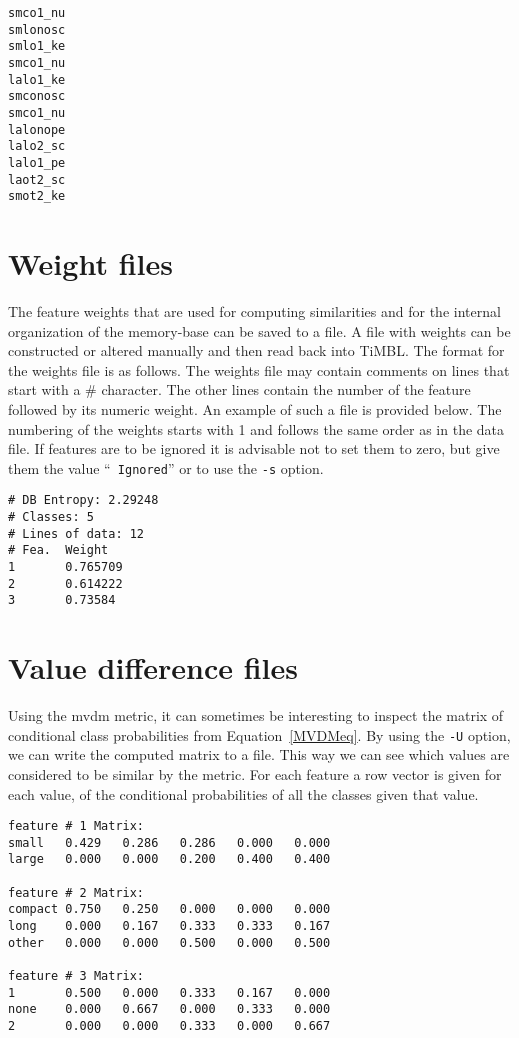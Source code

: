 \documentclass{report}
\begin{document}
\begin{verbatim}
smco1_nu
smlonosc
smlo1_ke
smco1_nu
lalo1_ke
smconosc
smco1_nu
lalonope
lalo2_sc
lalo1_pe
laot2_sc
smot2_ke
\end{verbatim}

\section{Weight files}
\label{weightformat}

The feature weights that are used for computing similarities and for
the internal organization of the memory-base can be saved to a file.
A file with weights can be constructed or altered manually and then
read back into TiMBL. The format for the weights file is as follows.
The weights file may contain comments on lines that start with a \#
character. The other lines contain the number of the feature followed
by its numeric weight. An example of such a file is provided
below. The numbering of the weights starts with 1 and follows the same
order as in the data file. If features are to be ignored it is
advisable not to set them to zero, but give them the value ``{\tt
Ignored}'' or to use the {\tt -s} option.

\begin{verbatim}
# DB Entropy: 2.29248
# Classes: 5
# Lines of data: 12
# Fea.  Weight
1       0.765709
2       0.614222
3       0.73584
\end{verbatim}

\section{Value difference files}
\label{mvdmformat}

Using the {\sc mvdm} metric, it can sometimes be interesting to
inspect the matrix of conditional class probabilities from
Equation~\ref{MVDMeq}. By using the {\tt -U} option, we can write the
computed matrix to a file. This way we can see which values are
considered to be similar by the metric. For each feature a row vector
is given for each value, of the conditional probabilities of all the
classes given that value.

\begin{verbatim}
feature # 1 Matrix: 
small   0.429   0.286   0.286   0.000   0.000
large   0.000   0.000   0.200   0.400   0.400
 
feature # 2 Matrix: 
compact 0.750   0.250   0.000   0.000   0.000
long    0.000   0.167   0.333   0.333   0.167
other   0.000   0.000   0.500   0.000   0.500
 
feature # 3 Matrix: 
1       0.500   0.000   0.333   0.167   0.000
none    0.000   0.667   0.000   0.333   0.000
2       0.000   0.000   0.333   0.000   0.667
\end{verbatim}
\end{document}
